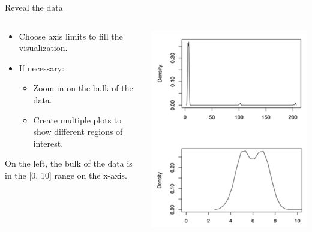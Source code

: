 \documentclass[aspectratio=169]{../latex_main/tntbeamer}  %
\begin{document}
	
	\begin{frame}{Reveal the data}
	
	    \begin{columns}
	        \begin{column}{.5\textwidth}
	        
	                \begin{itemize}
	                    \item Choose axis limits to fill the visualization.
	                    \item If necessary:
	                    \begin{itemize}
	                        \item Zoom in on the bulk of the data.
	                        \item Create multiple plots to show different regions of interest.
	                    \end{itemize}
	                \end{itemize}
	                On the left, the bulk of the data is in the [0, 10] range on the x-axis.
	        \end{column}
	        
	        
	        \begin{column}{.5\textwidth}
	        
	                    \centering
	                    \includegraphics[scale=.38]{Bild54}
	                    
	        \end{column}
	    \end{columns}
	\end{frame}
\end{document}
